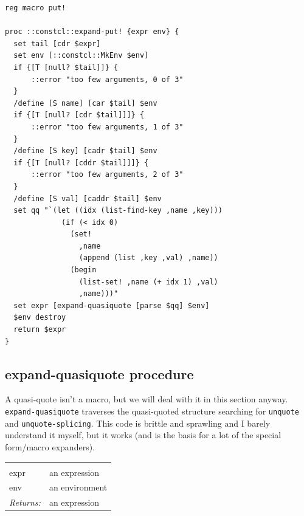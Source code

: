 \documentclass[twoside]{report}
\begin{document}
\begin{lstlisting}
reg macro put!

proc ::constcl::expand-put! {expr env} {
  set tail [cdr $expr]
  set env [::constcl::MkEnv $env]
  if {[T [null? $tail]]} {
      ::error "too few arguments, 0 of 3"
  }
  /define [S name] [car $tail] $env
  if {[T [null? [cdr $tail]]]} {
      ::error "too few arguments, 1 of 3"
  }
  /define [S key] [cadr $tail] $env
  if {[T [null? [cddr $tail]]]} {
      ::error "too few arguments, 2 of 3"
  }
  /define [S val] [caddr $tail] $env
  set qq "`(let ((idx (list-find-key ,name ,key)))
             (if (< idx 0)
               (set!
                 ,name
                 (append (list ,key ,val) ,name))
               (begin
                 (list-set! ,name (+ idx 1) ,val)
                 ,name)))"
  set expr [expand-quasiquote [parse $qq] $env]
  $env destroy
  return $expr
}
\end{lstlisting}

\subsection{expand-quasiquote procedure}
\label{expandquasiquote-procedure}

A quasi-quote isn't a macro, but we will deal with it in this section anyway. \texttt{expand-quasiquote} traverses the quasi-quoted structure searching for \texttt{unquote} and \texttt{unquote-splicing}. This code is brittle and sprawling and I barely understand it myself, but it works (and is the basis for a lot of the special form/macro expanders).

\noindent\begin{tabular}{ |p{1.9cm} p{8cm}| }
\hline
\rowcolor[HTML]{CCCCCC} \multicolumn{2}{|l|}{\bf expand-quasiquote (internal)} \\
expr & an expression \\
env & an environment \\
\textit{Returns:} & an expression \\
\hline
\end{tabular}
\end{document}
